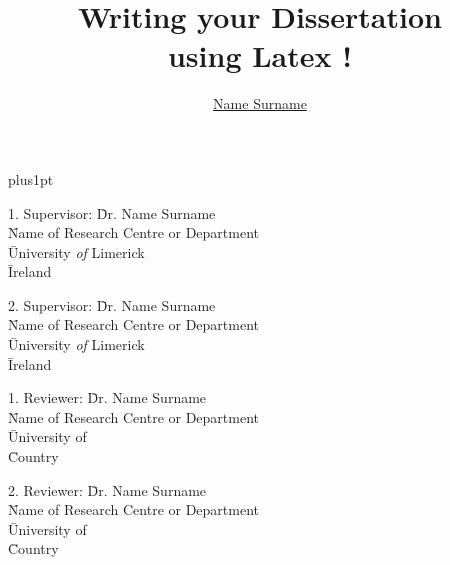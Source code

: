 \documentclass[twoside,12pt]{Latex/Classes/PhDthesisPSnPDF}
\title{Writing your Dissertation \\ using Latex !}
\author{\href{mailto: email@email.com}{Name Surname}}
\begin{document}



\renewcommand\baselinestretch{1.2}
\baselineskip=18pt plus1pt



\maketitle  %



\newpage


 \begin{tabbing}
1.  Supervisor: \= Dr. Name Surname    \\
 \>  \= Name of Research Centre or Department\\
 \>  \= University \emph{of} Limerick \\
 \>  \= Ireland \\
 \end{tabbing}


 \begin{tabbing}
2. Supervisor: \= Dr. Name Surname \\
 \>  \= Name of Research Centre or Department \\
 \>  \= University \emph{of} Limerick \\
 \>  \= Ireland \\
\end{tabbing}

\begin{tabbing}
1. Reviewer: \= Dr. Name Surname \\
 \>  \= Name of Research Centre or Department\\
 \>  \= University of  \\
 \>  \= Country \\
\end{tabbing}

 \begin{tabbing}
2. Reviewer: \= Dr. Name Surname \\
 \>  \= Name of Research Centre or Department \\
 \>  \= University of  \\
 \>  \= Country \\
\end{tabbing}
\end{document}
